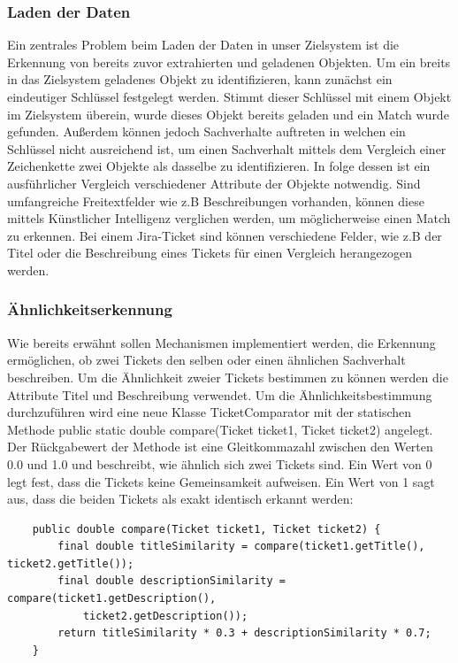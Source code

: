 \documentclass[10pt]{article}
\begin{document}
\subsubsection{Laden der Daten}
Ein zentrales Problem beim Laden der Daten in unser Zielsystem ist die Erkennung von bereits zuvor extrahierten und geladenen Objekten. Um ein breits in das Zielsystem geladenes Objekt zu identifizieren, kann zunächst ein eindeutiger Schlüssel festgelegt werden. Stimmt dieser Schlüssel mit einem Objekt im Zielsystem überein, wurde dieses Objekt bereits geladen und ein Match wurde gefunden. Außerdem können jedoch Sachverhalte auftreten in welchen ein Schlüssel nicht ausreichend ist, um einen Sachverhalt mittels dem Vergleich einer Zeichenkette zwei Objekte als dasselbe zu identifizieren. In folge dessen ist ein ausführlicher Vergleich verschiedener Attribute der Objekte notwendig. Sind umfangreiche Freitextfelder wie z.B Beschreibungen vorhanden, können diese mittels Künstlicher Intelligenz verglichen werden, um möglicherweise einen Match zu erkennen. Bei einem Jira-Ticket sind können verschiedene Felder, wie z.B der Titel oder die Beschreibung eines Tickets für einen Vergleich herangezogen werden.
\subsubsection{Ähnlichkeitserkennung}
Wie bereits erwähnt sollen Mechanismen implementiert werden, die Erkennung ermöglichen, ob zwei Tickets den selben oder einen ähnlichen Sachverhalt beschreiben. Um die Ähnlichkeit zweier Tickets bestimmen zu können werden die Attribute Titel und Beschreibung verwendet. Um die Ähnlichkeitsbestimmung durchzuführen wird eine neue Klasse \glqq TicketComparator\grqq\: mit der statischen Methode \glqq public static double compare(Ticket ticket1, Ticket ticket2)\grqq\: angelegt. Der Rückgabewert der Methode ist eine Gleitkommazahl zwischen den Werten 0.0 und 1.0 und beschreibt, wie ähnlich sich zwei Tickets sind. Ein Wert von 0 legt fest, dass die Tickets keine Gemeinsamkeit aufweisen. Ein Wert von 1 sagt aus, dass die beiden Tickets als exakt identisch erkannt werden:
\begin{verbatim}
    public double compare(Ticket ticket1, Ticket ticket2) {
        final double titleSimilarity = compare(ticket1.getTitle(), ticket2.getTitle());
        final double descriptionSimilarity = compare(ticket1.getDescription(), 
            ticket2.getDescription());
        return titleSimilarity * 0.3 + descriptionSimilarity * 0.7;
    }
\end{verbatim}
\end{document}
